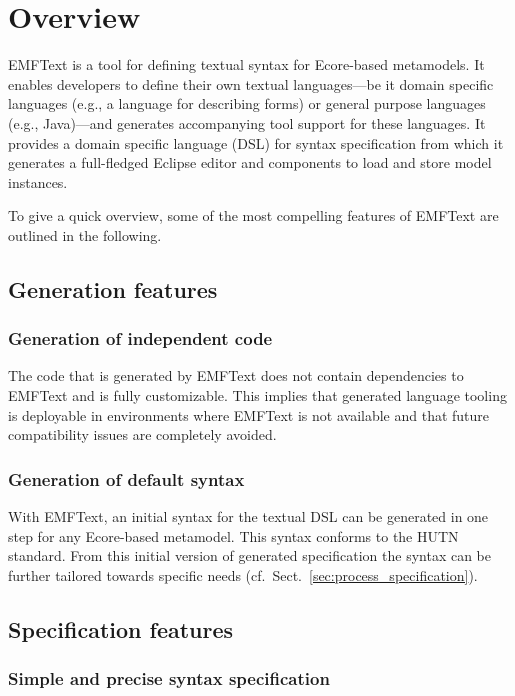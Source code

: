 \chapter{Overview}
EMFText is a tool for defining textual syntax for Ecore-based metamodels. It 
enables developers to define their own textual languages---be it domain
specific languages (e.g., a language for describing forms) or general purpose 
languages (e.g., Java)---and generates accompanying tool support for these 
languages. It provides a domain specific language (DSL) for syntax 
specification from which it generates a full-fledged Eclipse editor and 
components to load and store model instances.

To give a quick overview, some of the most compelling features of EMFText are 
outlined in the following.

\section{Generation features}

\subsection{Generation of independent code}

The code that is generated by EMFText does not contain dependencies to EMFText 
and is fully customizable. This implies that generated language tooling is 
deployable in environments where EMFText is not available and that future 
compatibility issues are completely avoided.

\subsection{Generation of default syntax}

With EMFText, an initial syntax for the textual DSL can be generated in one
step for any Ecore-based metamodel. This syntax conforms to the HUTN 
standard. From this initial version of generated specification the syntax can 
be further tailored towards specific needs (cf.~Sect.~\ref{sec:process_specification}).


\section{Specification features}

\subsection{Simple and precise syntax specification}

